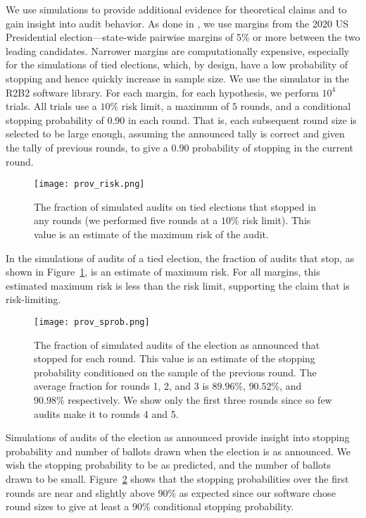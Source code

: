 We use simulations to provide additional evidence for theoretical claims and to gain insight into audit behavior. As done in \cite{simulations}, we use margins from the 2020 US Presidential election---state-wide pairwise margins of 5\% or more between the two leading candidates. Narrower margins are computationally expensive, especially for the simulations of tied elections, which, by design, have a low probability of stopping and hence quickly increase in sample size. We use the simulator in the R2B2 software library\cite{r2b2_anon}. For each margin, for each hypothesis, we perform $10^4$ trials. All trials use a $10\%$ risk limit, a maximum of $5$ rounds, and a conditional stopping probability of $0.90$ in each round. That is, each subsequent round size is selected to be large enough, assuming the announced tally is correct and given the tally of previous rounds, to give a $0.90$ probability of stopping in the current round.

\begin{figure}
\texttt{[image: prov\_risk.png]}
\caption{The fraction of simulated \Providence audits on tied elections that stopped in any rounds (we performed five rounds at a $10\%$ risk limit). This value is an estimate of the maximum risk of the \Providence audit.}
\label{fig:prov-risk}
\end{figure}

In the simulations of \Providence audits of a tied election, the fraction of audits that stop, as shown in Figure~\ref{fig:prov-risk}, is an estimate of maximum risk. For all margins, this estimated maximum risk is less than the risk limit, supporting the claim that \Providence is risk-limiting.

\begin{figure}
\texttt{[image: prov\_sprob.png]}
\caption{The fraction of simulated \Providence audits of the election as announced that stopped for each round. This value is an estimate of the stopping probability conditioned on the sample of the previous round. The average fraction for rounds 1, 2, and 3 is $89.96\%$, $90.52\%$, and $90.98\%$ respectively. We show only the first three rounds since so few audits make it to rounds 4 and 5.}
\label{fig:prov-sprob}
\end{figure}

Simulations of audits of the election as announced provide insight into stopping probability and number of ballots drawn when the election is as announced. We wish the stopping probability to be as predicted, and the number of ballots drawn to be small. Figure~\ref{fig:prov-sprob} shows that the stopping probabilities over the first rounds are near and slightly above $90\%$ as expected since our software chose round sizes to give at least a $90\%$ conditional stopping probability.

